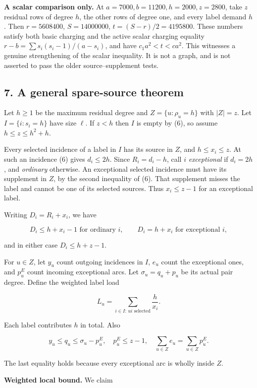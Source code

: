 \documentclass[
  11pt,
  a4paper,
]{article}
\begin{document}
\textbf{A scalar comparison only.} At \(a=7000,b=11200,h=2000,z=2800\),
take \(z\) residual rows of degree \(h\), the other rows of degree one,
and every label demand \(h\). Then \(r=5608400\), \(S=14000000\),
\(t=(S-r)/2=4195800\). These numbers satisfy both basic charging and the
active scalar charging equality \(r-b=\sum s_i(s_i-1)/(a-s_i)\), and
have \(c_1a^2<t<ca^2\). This witnesses a genuine strengthening of the
scalar inequality. It is not a graph, and is not asserted to pass the
older source--supplement tests.

\subsection{7. A general spare-source
theorem}\label{a-general-spare-source-theorem}

Let \(h\ge1\) be the maximum residual degree and \(Z=\{u:\rho_u=h\}\)
with \(|Z|=z\). Let \(I=\{i:s_i=h\}\) have size \(\ell\). If \(z<h\)
then \(I\) is empty by (6), so assume \(h\le z\le h^2+h\).

Every selected incidence of a label in \(I\) has its source in \(Z\),
and \(h\le x_i\le z\). At such an incidence (6) gives \(d_i\le2h\).
Since \(R_i=d_i-h\), call \(i\) \emph{exceptional} if \(d_i=2h\), and
\emph{ordinary} otherwise. An exceptional selected incidence must have
its supplement in \(Z\), by the second inequality of (6). That
supplement misses the label and cannot be one of its selected sources.
Thus \(x_i\le z-1\) for an exceptional label.

Writing \(D_i=R_i+x_i\), we have

\[D_i\le h+x_i-1\text{ for ordinary }i,\qquad D_i=h+x_i\text{ for exceptional }i,\]

and in either case \(D_i\le h+z-1\).

For \(u\in Z\), let \(y_u\) count outgoing incidences in \(I\), \(e_u\)
count the exceptional ones, and \(p^E_u\) count incoming exceptional
arcs. Let \(\sigma_u=q_u+p_u\) be its actual pair degree. Define the
weighted label load

\[L_u=\sum_{i\in I:\,ui\text{ selected}}\frac h{x_i}.\]

Each label contributes \(h\) in total. Also

\[y_u\le q_u\le\sigma_u-p^E_u,\quad p^E_u\le z-1,\quad \sum_{u\in Z}e_u=\sum_{u\in Z}p^E_u. \tag{13}\]

The last equality holds because every exceptional arc is wholly inside
\(Z\).

\textbf{Weighted local bound.} We claim
\end{document}
